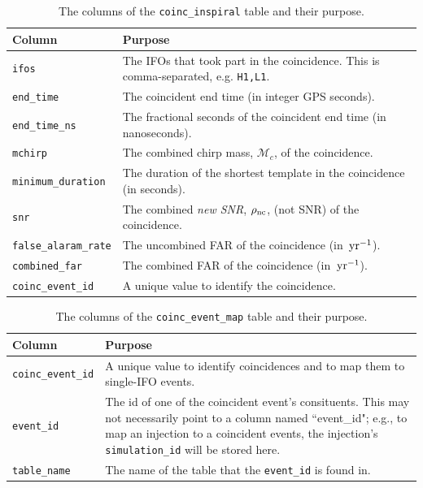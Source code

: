 \begin{table}[h]
\label{tab:coinc_inspiral}
\center
\begin{tabular}{l | p{9cm}}
Column      &   Purpose     \\
\hline \hline
\texttt{ifos}   &   The \acp{IFO} that took part in the coincidence. This is comma-separated, e.g. \texttt{H1,L1}. \\
\hline
\texttt{end\_time}  &   The coincident end time (in integer GPS seconds). \\
\hline
\texttt{end\_time\_ns} &    The fractional seconds of the coincident end time (in nanoseconds). \\
\hline
\texttt{mchirp} &   The combined chirp mass, $\mathcal{M}_c$, of the coincidence. \\
\hline
\texttt{minimum\_duration}  &   The duration of the shortest template in the coincidence (in seconds). \\
\hline
\texttt{snr}    &   The combined \emph{new \ac{SNR}}, $\rho_{\mathrm{nc}}$, (not \ac{SNR}) of the coincidence. \\
\hline
\texttt{false\_alaram\_rate} & The uncombined \ac{FAR} of the coincidence (in $\,\mathrm{yr}^{-1}$). \\
\hline
\texttt{combined\_far}  & The combined \ac{FAR} of the coincidence (in $\,\mathrm{yr}^{-1}$). \\
\hline
\texttt{coinc\_event\_id}   & A unique value to identify the coincidence.
\end{tabular}
\caption{The columns of the \texttt{coinc\_inspiral} table and their purpose.}
\end{table}

\begin{table}[h]
\label{tab:coinc_event_map}
\center
\begin{tabular}{l | p{9cm}}
Column      &   Purpose     \\
\hline \hline
\texttt{coinc\_event\_id}   &   A unique value to identify coincidences and to map them to single-\ac{IFO} events. \\
\hline
\texttt{event\_id}  & The id of one of the coincident event's consituents. This may not necessarily point to a column named ``event\_id"; e.g., to map an injection to a coincident events, the injection's \texttt{simulation\_id} will be stored here. \\
\hline
\texttt{table\_name}    &   The name of the table that the \texttt{event\_id} is found in.
\end{tabular}
\caption{The columns of the \texttt{coinc\_event\_map} table and their purpose.}
\end{table}

